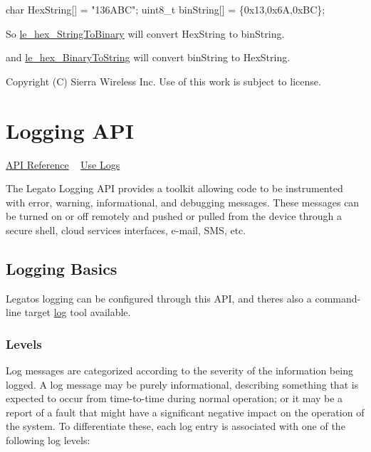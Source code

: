 \begin{DoxyCode}
\textcolor{keywordtype}{char}     HexString[] = \textcolor{stringliteral}{"136ABC"};
uint8\_t  binString[] = \{0x13,0x6A,0xBC\};
\end{DoxyCode}


So \hyperlink{le__hex_8h_a2ad2c35d567e8fc3fc962a58272b093d}{le\+\_\+hex\+\_\+\+String\+To\+Binary} will convert Hex\+String to bin\+String.

and \hyperlink{le__hex_8h_a2482e5240d47b176e41369fc5a654551}{le\+\_\+hex\+\_\+\+Binary\+To\+String} will convert bin\+String to Hex\+String.





Copyright (C) Sierra Wireless Inc. Use of this work is subject to license. \hypertarget{c_logging}{}\section{Logging A\+P\+I}\label{c_logging}
\hyperlink{le__log_8h}{A\+P\+I Reference} ~\newline
 \hyperlink{howToLogs}{Use Logs} 



The Legato Logging A\+P\+I provides a toolkit allowing code to be instrumented with error, warning, informational, and debugging messages. These messages can be turned on or off remotely and pushed or pulled from the device through a secure shell, cloud services interfaces, e-\/mail, S\+M\+S, etc.\hypertarget{c_logging_c_log_logging}{}\subsection{Logging Basics}\label{c_logging_c_log_logging}
Legato\textquotesingle{}s logging can be configured through this A\+P\+I, and there\textquotesingle{}s also a command-\/line target \hyperlink{toolsTarget_log}{log} tool available.\hypertarget{c_logging_c_log_levels}{}\subsubsection{Levels}\label{c_logging_c_log_levels}
Log messages are categorized according to the severity of the information being logged. A log message may be purely informational, describing something that is expected to occur from time-\/to-\/time during normal operation; or it may be a report of a fault that might have a significant negative impact on the operation of the system. To differentiate these, each log entry is associated with one of the following log levels\+:


